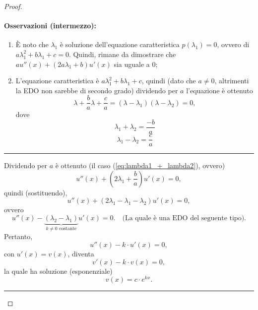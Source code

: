 \begin{proof}
\begin{enumerate}
		\paragraph{Osservazioni (intermezzo):}
		\begin{enumerate}
			\item È noto che $\lambda_1$ è soluzione dell'equazione caratteristica $p(\lambda_1)=0$, ovvero di $a\lambda_1^2+b\lambda_1 +c=0$. Quindi, rimane da dimostrare che $a u''(x)+(2a\lambda_1 + b)u'(x)$ sia uguale a 0;
			\item L'equazione caratteristica è $a\lambda_1^2+b\lambda_1 +c$, quindi (dato che $a\neq0$, altrimenti la EDO non sarebbe di secondo grado) dividendo per $a$ l'equazione è ottenuto
			\begin{equation*}
				\lambda + \frac{b}{a} \lambda + \frac{c}{a}= (\lambda - \lambda_1)(\lambda - \lambda_2) = 0,
			\end{equation*}
			dove
			\begin{equation}\label{eq:lambda1_+_lambda2}
				\lambda_1 + \lambda_2 = \frac{-b}{a}
			\end{equation}
			\begin{equation*}
				\lambda_1 - \lambda_2 = \frac{c}{a}
			\end{equation*}
		\end{enumerate}
		\hrule\vspace{2px}
	
		\noindent Dividendo per $a$ è ottenuto (il caso (\ref{eq:lambda1_+_lambda2}), ovvero)
		\begin{equation*}
			u''(x)+\left(2\lambda_1+\frac{b}{a}\right)u'(x)=0,
		\end{equation*}
		quindi (sostituendo),
		\begin{equation*}
			u''(x) + (2\lambda_1 -\lambda_1-\lambda_2) u'(x) = 0,
		\end{equation*}
		ovvero
		\begin{equation*}
			u''(x) - \underbrace{(\lambda_2-\lambda_1)}_{k\neq 0\text{ costante}} u'(x) = 0.\quad\text{(La quale è una EDO del seguente tipo)}.
		\end{equation*}
		Pertanto,
		\begin{equation*}
			u''(x)- k\cdot u'(x) = 0,
		\end{equation*}
		con $u'(x)=v(x)$, diventa
		\begin{equation}\label{eq:edo_variabili_separabili_dimostrazione_integrale_generale_edo_seecondo_grado}
			v'(x) - k \cdot v(x)=0,
		\end{equation}
		la quale ha soluzione (esponenziale)
		\begin{equation*}
			v(x) = c \cdot e^{kx}.
		\end{equation*}
		\hrule\vspace{-7px}

\end{enumerate}
\end{proof}
